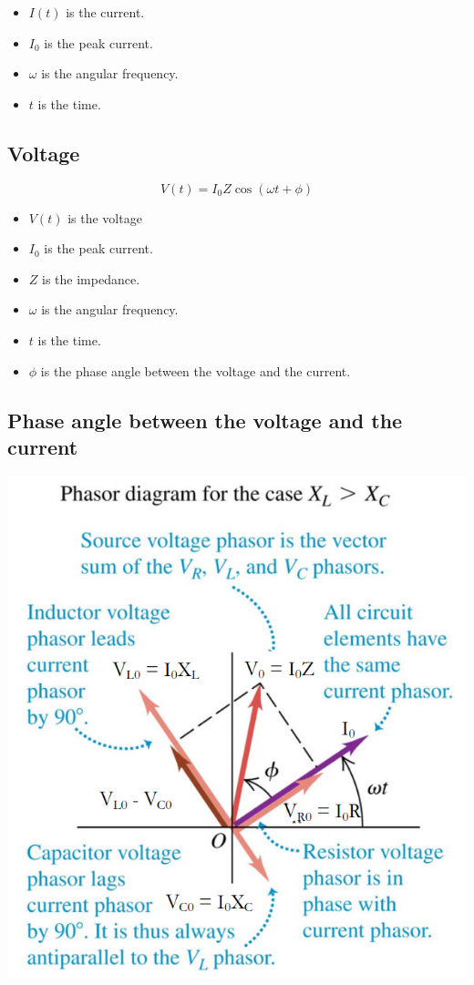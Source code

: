 \documentclass[11pt]{article}
\begin{document}
\begin{itemize}
\item \(I(t)\) is the current.
\item \(I_0\) is the peak current.
\item \(\omega\) is the angular frequency.
\item \(t\) is the time.
\end{itemize}
\subsection{Voltage}
\label{sec:org21771a1}
\[V(t) = I_0 Z \cos (\omega t + \phi)\]

\begin{itemize}
\item \(V(t)\) is the voltage
\item \(I_0\) is the peak current.
\item \(Z\) is the impedance.
\item \(\omega\) is the angular frequency.
\item \(t\) is the time.
\item \(\phi\) is the phase angle between the voltage and the current.
\end{itemize}

\newpage
\subsection{Phase angle between the voltage and the current}
\label{sec:org4c2b5b4}
\begin{center}
\includegraphics[width=.9\linewidth]{./images/rcl-circuit-phasor-diagram-phase-angle.png}
\end{center}
\end{document}
